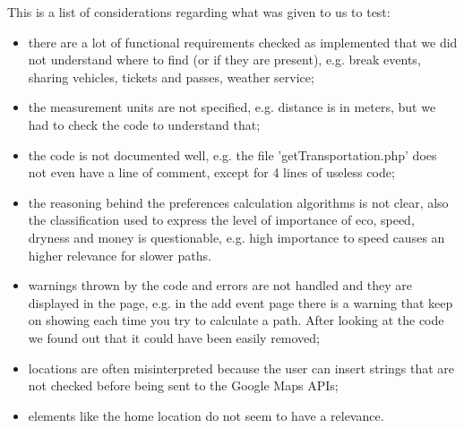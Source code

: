 This is a list of considerations regarding what was given to us to test:
\begin{itemize}
\item there are a lot of functional requirements checked as implemented that we did not understand where to find (or if they are present), e.g. break events, sharing vehicles, tickets and passes, weather service;
\item the measurement units are not specified, e.g. distance is in meters, but we had to check the code to understand that;
\item the code is not documented well, e.g. the file 'getTransportation.php' does not even have a line of comment, except for 4 lines of useless code;
\item the reasoning behind the preferences calculation algorithms is not clear, also the classification used to express the level of importance of eco, speed, dryness and money is questionable, e.g. high importance to speed causes an higher relevance for slower paths.
\item warnings thrown by the code and errors are not handled and they are displayed in the page, e.g. in the add event page there is a warning that keep on showing each time you try to calculate a path. After looking at the code we found out that it could have been easily removed;
\item locations are often misinterpreted because the user can insert strings that are not checked before being sent to the Google Maps APIs;
\item elements like the home location do not seem to have a relevance.
\end{itemize}